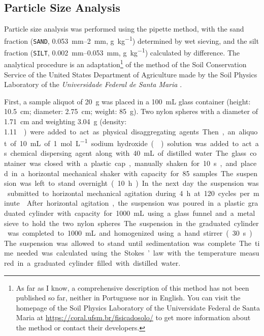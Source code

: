 \subsection{Particle Size Analysis}
\label{chap:chap04-granulometry}

\def\footsuzuki{\footnote{As far as I know, a comprehensive description of this method has not been 
published so far, neither in Portuguese nor in English. You can visit the homepage of the Soil Physics 
Laboratory of the Universidate Federal de Santa Maria at \url{https://coral.ufsm.br/fisicadosolo/} to get more 
information about the method or contact their developers.}}

Particle size analysis was performed using the pipette method, with the sand fraction (\texttt{SAND}, 
\SIrange{0.053}{2}{\milli\metre}, \si{\gram\per\kilo\gram}) determined by wet sieving, and the silt fraction 
(\texttt{SILT}, \SIrange{0.002}{0.053}{\milli\metre}, \si{\gram\per\kilo\gram}) calculated by difference. 
The analytical procedure is an adaptation\footsuzuki{} of the method of the Soil Conservation Service of 
the United States Department of Agriculture \cite{UnitedStates1972} made by the Soil Physics Laboratory of the 
\textit{Universidade Federal de Santa Maria} \cite{SuzukiEtAl2004, SuzukiEtAl2004a}.

First, a sample aliquot of \SI{20}{\gram} was placed in a \SI{100}{\milli\liter} glass container (height: 
\SI{10.5}{\centi\metre}; diameter: \SI{2.75}{\centi\metre}; weight: \SI{85}{\gram}). Two nylon spheres with a 
diameter of \SI{1.71}{\centi\metre} and weighting \SI{3.04}{\gram} (density: \SI{1.11}{\g\per\cm\cubic}) were 
added to act as physical disaggregating agents. Then, an aliquot of \SI{10}{\milli\liter} of 
\SI{1}{\mole\per\liter} sodium hydroxide () solution was added to act as chemical dispersing agent 
along with \SI{40}{\milli\liter} of distilled water. The glass container was closed with a plastic cap, 
manually shaken for \SI{10}{\second}, and placed in a horizontal mechanical shaker with capacity for 
\num{85}~samples. The suspension was left to stand overnight (\SI{10}{\hour}). In the next day the suspension 
was submitted to horizontal mechanical agitation during \SI{4}{\hour} at \si{120} cycles per minute 
\cite{SuzukiEtAl2004, SuzukiEtAl2004a}.

After horizontal agitation, the suspension was poured in a plastic graduated cylinder with capacity for 
\SI{1000}{\milli\liter} using a glass funnel and a metal sieve to hold the two nylon spheres. The suspension 
in 
the graduated cylinder was completed to \SI{1000}{\milli\liter} and homogenized using a hand stirrer 
(\SI{30}{\second}). The suspension was allowed to stand until sedimentation was complete. The time needed was 
calculated using the Stokes’ law with the temperature measured in a graduated cylinder filled with distilled 
water.

